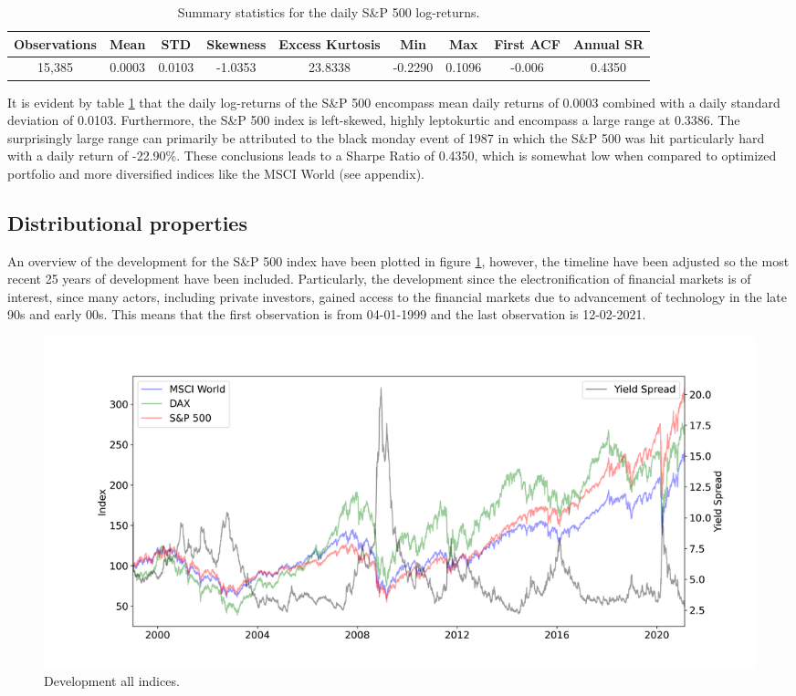 \begin{table}[H]
\caption{Summary statistics for the daily S\&P 500 log-returns.}
\centering
\begin{tabular}{c c c c c c c c c} 
\hline\hline
Observations & Mean & STD & Skewness & Excess Kurtosis & Min & Max & First ACF & Annual SR \\
\hline
15,385 & 0.0003 & 0.0103 & -1.0353 & 23.8338 & -0.2290 & 0.1096 & -0.006 & 0.4350 \\
\hline
\end{tabular}
\label{tab:summary_stats_S&P500}
\end{table}
 
It is evident by table \ref{tab:summary_stats_S&P500} that the daily log-returns of the S\&P 500 encompass mean daily returns of 0.0003 combined with a daily standard deviation of 0.0103. Furthermore, the S\&P 500 index is left-skewed, highly leptokurtic and encompass a large range at 0.3386. The surprisingly large range can primarily be attributed to the black monday event of 1987 in which the S\&P 500 was hit particularly hard with a daily return of -22.90\%. These conclusions leads to a Sharpe Ratio of 0.4350, which is somewhat low when compared to optimized portfolio and more diversified indices like the MSCI World (see appendix).

\subsection{Distributional properties} An overview of the development for the S\&P 500 index have been plotted in figure \ref{fig: all_indices_index}, however, the timeline have been adjusted so the most recent 25 years of development have been included. Particularly, the development since the electronification of financial markets is of interest, since many actors, including private investors, gained access to the financial markets due to advancement of technology in the late 90s and early 00s. This means that the first observation is from 04-01-1999 and the last observation is 12-02-2021. 
\begin{figure}[H] 
    \centering
    \includegraphics[width=1.0\textwidth]{analysis/data_description/images/comb_index.png}
    \caption{Development all indices.}
    \label{fig: all_indices_index}
\end{figure}

